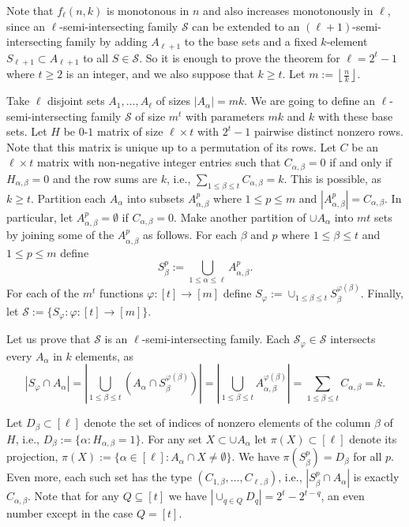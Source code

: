 \documentclass[12pt,a4paper]{amsart}
\numberwithin{equation}{section}
\theoremstyle{plain}
\theoremstyle{definition}
\renewcommand{\S}{{\mathcal{S}}}
\newcommand{\m}{\mathcal}
\newcommand{\NN}{n}
\begin{document}
 Note that $f_\ell(\NN,k)$ is monotonous in $\NN$ and also increases monotonously in $\ell$, since an $\ell$-semi-intersecting family $\m{S}$ can be extended to an $(\ell+1)$-semi-intersecting family by adding $A_{\ell+1}$ to the base sets and a fixed $k$-element $S_{\ell+1} \subset A_{\ell+1}$ to all $S \in \m{S}$.
So it is enough to prove the theorem for $\ell=2^t-1$ where $t\geq 2$ is an integer, and we also suppose that $k \geq t$.
Let $m:=\left\lfloor \frac{\NN}{k} \right\rfloor$.

Take $\ell$ disjoint sets $A_1, \dots, A_\ell$ of sizes $|A_\alpha|=mk$.
We are going to define an $\ell$-semi-intersecting family $\m{S}$ of size $m^t$ with parameters $mk$ and $k$ with these base sets.
Let $H$ be $0$-$1$ matrix of size $\ell \times t$ with $2^t-1$ pairwise distinct nonzero rows. Note that this matrix is unique up to a permutation of its rows.
Let $C$ be an  $\ell \times t$ matrix with non-negative integer entries such that $C_{\alpha,\beta}=0$ if and only if $H_{\alpha,\beta}=0$
 and the row sums are $k$, i.e., $\sum_{1\leq \beta\leq t} C_{\alpha,\beta}=k$. This is possible, as $k \geq t$.
Partition each $A_\alpha$ into subsets $A_{\alpha,\beta}^p$ where $1\leq p\leq m$ and $|A_{\alpha,\beta}^p|= C_{\alpha,\beta}$. In particular, let $A_{\alpha,\beta}^p=\emptyset$
if $C_{\alpha,\beta}=0$.
Make another partition of $\cup A_\alpha$ into $mt$ sets by joining some of the $A_{\alpha,\beta}^p$ as follows. For each $\beta$  and $p$ where $1\leq \beta \leq t$ and $1\leq p\leq m$ define
$$ S_\beta^p:= \bigcup_{1\leq \alpha \leq \ell}  A_{\alpha,\beta}^p.
$$
For each of the $m^t$ functions $\varphi: [t]\to [m]$  define
    $S_{\varphi}:=\cup_{1\leq \beta\leq t}  S_\beta^{\varphi(\beta)}$. Finally, let $\m{S}:=\{S_{\varphi}: \varphi: [t]\to [m] \}$.

Let us prove that $\m{S}$ is an $\ell$-semi-intersecting family.
Each $\S_\varphi\in \m{S}$ intersects every $A_\alpha$ in $k$ elements, as
    $$
    |S_\varphi \cap A_\alpha|=\left|\bigcup_{1\leq \beta\leq t} (A_\alpha \cap S_\beta^{\varphi(\beta)})\right|=
        \left| \bigcup_{1\leq \beta\leq t}  A_{\alpha,\beta}^{\varphi(\beta)} \right| = \sum_{1\leq \beta\leq t}   C_{\alpha,\beta}=k.
        $$

Let $D_\beta \subset [\ell]$ denote the set of indices of nonzero elements of the column $\beta$ of $H$, i.e.,
  $D_\beta:= \{ \alpha: H_{\alpha,\beta}=1\}$.
For any set $X\subset \cup A_\alpha$ let $\pi(X)\subset [\ell]$ denote its projection,  $\pi(X):=\{ \alpha\in  [\ell]:  A_\alpha\cap X\neq \emptyset\}$.
We have $\pi(S_\beta^p)=D_\beta$ for all $p$. Even more, each such set has the type $(C_{1, \beta}, \dots, C_{\ell, \beta})$, i.e., $|S_\beta^p\cap A_\alpha|$ is exactly $C_{\alpha,\beta}$.
Note that for any $Q\subseteq [t]$ we have $|\cup_{q\in Q} D_q|= 2^t-2^{t-q}$, an even number except in the case $Q=[t]$.
\end{document}
